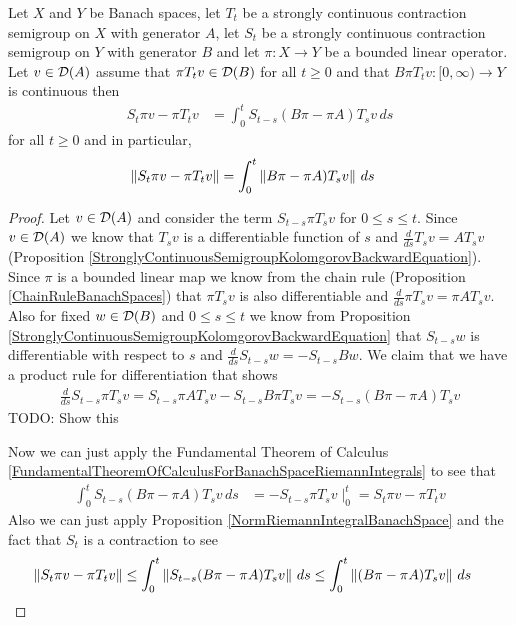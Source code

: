 \begin{lem}\label{SemigroupBoundInTermsOfBoundedGenerator2}Let $X$ and $Y$ be Banach spaces, let $T_t$ be a strongly continuous contraction semigroup on $X$ with generator $A$,
let $S_t$ be a strongly continuous contraction semigroup on $Y$ with generator $B$ and let $\pi : X \to Y$ be a bounded linear operator.  Let
$v \in \mathcal{D}(A)$ assume that $\pi T_t v \in \mathcal{D}(B)$ for all $t \geq 0$ and that $B \pi T_t v : [0,\infty) \to Y$ is continuous then
\begin{align*}
S_t \pi v - \pi T_t v &= \int_0^t S_{t-s} (B \pi - \pi A) T_s v \, ds
\end{align*}
for all $t \geq 0$ and in particular, 
\begin{align*}
\left \lVert S_t \pi v - \pi T_t v \right \rVert &= \int_0^t \left \lVert B \pi - \pi A) T_s v \right \rVert \, ds
\end{align*}
\end{lem}
\begin{proof}
Let $v \in \mathcal{D}(A)$ and consider the term $S_{t - s} \pi T_s v$ for $0 \leq s \leq t$.  Since $v \in \mathcal{D}(A)$ we know that $T_s v$ is a differentiable function of $s$ and 
$\frac{d}{ds} T_s v = A T_s v$ (Proposition \ref{StronglyContinuousSemigroupKolomgorovBackwardEquation}).   Since $\pi$ is a bounded linear map we know from the chain rule (Proposition \ref{ChainRuleBanachSpaces}) that $\pi T_s v$ is also differentiable and $\frac{d}{ds} \pi T_s v = \pi A T_s v$.  Also for fixed $w \in \mathcal{D}(B)$ and $0 \leq s \leq t$ we know from Proposition \ref{StronglyContinuousSemigroupKolomgorovBackwardEquation} that $S_{t -s} w$ is differentiable with respect to $s$ and $\frac{d}{ds} S_{t -s} w = - S_{t-s} B w$.  We claim that we have a product rule for differentiation that shows
\begin{align*}
\frac{d}{ds} S_{t - s} \pi T_s v = S_{t-s} \pi A T_s v - S_{t-s} B \pi T_s v = -S_{t -s} (B \pi - \pi A) T_s v
\end{align*}
TODO: Show this

Now we can just apply the Fundamental Theorem of Calculus \ref{FundamentalTheoremOfCalculusForBanachSpaceRiemannIntegrals} to see that
\begin{align*}
\int_0^t S_{t -s} (B \pi - \pi A) T_s v \, ds &= -S_{t - s} \pi T_s v \mid_{0}^t = S_t \pi v - \pi T_t v
\end{align*}
Also we can just apply Proposition \ref{NormRiemannIntegralBanachSpace} and the fact that $S_t$ is a contraction to see
\begin{align*}
\left \lVert S_t \pi v - \pi T_t v \right \rVert &\leq \int_0^t \left \lVert S_{t -s} (B \pi - \pi A) T_s v \right \rVert \, ds \leq \int_0^t \left \lVert (B \pi - \pi A) T_s v \right \rVert \, ds
\end{align*}
\end{proof}

